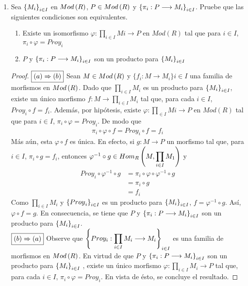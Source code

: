 \documentclass{article}
\begin{document}
\begin{enumerate}[label=\textbf{Ej \arabic*.}]
	\item Sea ${\left\{{M}_{i}\right\}}_{i\in I}$ en $Mod\left(R\right)$, $P \in Mod\left(R\right)$ y $\left\{\pi_{i}: P \longrightarrow M_{i}\right\}_{i \in I}$. Pruebe que las siguientes condiciones son equivalentes.
	\begin{enumerate}
		\item Existe un isomorfismo $\varphi : \displaystyle\prod_{i \in I} Mi \longrightarrow P$ en $Mod(R)$ tal que para $i \in I$, $\pi_{i}\circ\varphi = Proy_{i}$
		\item $P$ y $\left\{\pi_{i}: P \longrightarrow M_{i}\right\}_{i \in I}$ son un producto para ${\left\{{M}_{i}\right\}}_{i\in I}$
	\end{enumerate}
	\begin{proof}
		$\boxed{\left(a\right)\Rightarrow\left(b\right)}$ Sean $M \in Mod\left(R\right)$ y $\{f_{i}:M \longrightarrow M_{i}\}{i \in I}$ una familia de morfismos en $Mod\left(R\right)$. Dado que $\displaystyle\prod_{i \in I}M_{i}$ es un producto para ${\left\{{M}_{i}\right\}}_{i\in I}$, existe un único morfismo $f:M\longrightarrow\displaystyle\prod_{i \in I}M_{i}$ tal que, para cada $i \in I$, $Proy_{i} \circ f = f_{i}$. Además, por hipótesis, existe $\varphi : \displaystyle\prod_{\in I} Mi \longrightarrow P$ en $Mod(R)$ tal que para $i \in I$, $\pi_{i}\circ\varphi = Proy_{i}$. De modo que 
		\begin{align*}
			\pi_{i}\circ\varphi\circ f = Proy_{i} \circ f = f_{i}
		\end{align*}
		Más aún, esta $\varphi \circ f$ es única. En efecto, si $g:M \longrightarrow P$ un morfismo tal que, para $i \in I$, $\pi_{i}\circ g = f_{i}$, entonces $\varphi^{-1}\circ g \in Hom_{R}\left(M,\displaystyle\prod_{i \in I}M_{1}\right)$ y
		\begin{align*}
			Proy_{i}\circ\varphi^{-1}\circ g &= \pi_{i}\circ\varphi\circ\varphi^{-1}\circ g\\
			&= \pi_{i}\circ g\\
			&= f_{i}
		\end{align*}
		Como $\displaystyle\prod_{i \in I}M_{i}$ y ${\left\{{Proy}_{i}\right\}}_{i\in I}$ es un producto para ${\left\{{M}_{i}\right\}}_{i\in I}$, $f=\varphi^{-1}\circ g$. Así, $\varphi\circ f=g$. En consecuencia, se tiene que $P$ y $\left\{\pi_{i}: P \longrightarrow M_{i}\right\}_{i \in I}$ son un producto para ${\left\{{M}_{i}\right\}}_{i\in I}$.\\
		
		$\boxed{\left(b\right)\Rightarrow\left(a\right)}$ Observe que $\left\{Proy_{i}:\displaystyle\prod_{i \in I} M_{i} \longrightarrow M_{i}\right\}_{i \in I}$ es una familia de morfismos en $Mod\left(R\right)$. En virtud de que $P$ y $\left\{\pi_{i}:P \longrightarrow M_{i}\right\}_{i \in I}$ son un producto para ${\left\{{M}_{i}\right\}}_{i\in I}$ , existe un único morfismo $\varphi:\displaystyle\prod_{i \in I} M_{i} \longrightarrow P$ tal que, para cada $i \in I$, $\pi_{i}\circ\varphi = Proy_{i}$. En vista de ésto, se concluye el resultado.
	\end{proof}
	

\end{enumerate}
\end{document}
